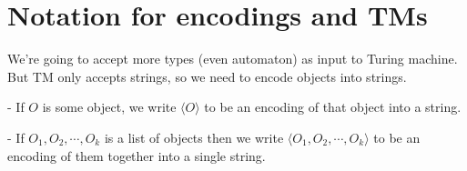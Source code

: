 \section{Notation for encodings and TMs}

We're going to accept more types (even automaton) as input to Turing machine. But TM only accepts strings, so we need to encode objects into strings.

- If \(O\) is some object, we write \(\langle O \rangle\) to be an encoding of that object into a string.  

- If \(O_1, O_2, \cdots, O_k\) is a list of objects then we write \(\langle O_1, O_2, \cdots, O_k \rangle\)  to be an encoding of them together into a single string. 

